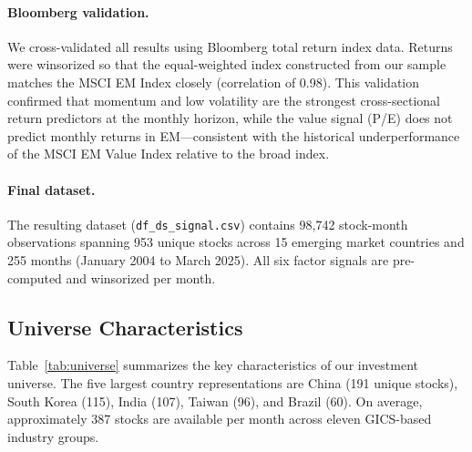 \documentclass[12pt,a4paper]{article}
\begin{document}
\paragraph{Bloomberg validation.} We cross-validated all results using Bloomberg total return index data. Returns were winsorized so that the equal-weighted index constructed from our sample matches the MSCI EM Index closely (correlation of 0.98). This validation confirmed that momentum and low volatility are the strongest cross-sectional return predictors at the monthly horizon, while the value signal (P/E) does not predict monthly returns in EM---consistent with the historical underperformance of the MSCI EM Value Index relative to the broad index.

\paragraph{Final dataset.} The resulting dataset (\texttt{df\_ds\_signal.csv}) contains 98,742 stock-month observations spanning 953 unique stocks across 15 emerging market countries and 255 months (January 2004 to March 2025). All six factor signals are pre-computed and winsorized per month.

\subsection{Universe Characteristics}

Table~\ref{tab:universe} summarizes the key characteristics of our investment universe. The five largest country representations are China (191 unique stocks), South Korea (115), India (107), Taiwan (96), and Brazil (60). On average, approximately 387 stocks are available per month across eleven GICS-based industry groups.
\end{document}
